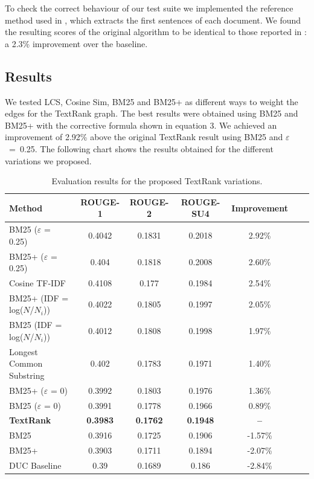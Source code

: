 \documentclass{llncs}
\begin{document}
To check the correct behaviour of our test suite we implemented the reference method used in \cite{mihalcea-tarau}, which extracts the first sentences of each document. We found the resulting scores of the original algorithm to be identical to those reported in \cite{mihalcea-tarau}: a 2.3\% improvement over the baseline.


\subsection{Results}
We tested LCS, Cosine Sim, BM25 and BM25+ as different ways to weight the edges for the TextRank graph. 
The best results were obtained using BM25 and BM25+ with the corrective formula shown in equation 3. We achieved an improvement of 2.92\% above the original TextRank result using BM25 and \mbox{$\varepsilon$ = 0.25}. The following chart shows the results obtained for the different variations we proposed.

\begin{table}
\caption{Evaluation results for the proposed TextRank variations.}
\begin{center}
\begin{tabular}{l*{5}{c}r}
\hline
\rule{0pt}{12pt}
Method & ROUGE-1 & ROUGE-2 & ROUGE-SU4 & Improvement \\[2pt]
\hline\rule{0pt}{12pt}\mbox{}\par\nobreak
BM25 ($\varepsilon$ = 0.25) & 0.4042 & 0.1831 & 0.2018 & 2.92\% \\
BM25+ ($\varepsilon$ = 0.25) & 0.404 & 0.1818 & 0.2008 & 2.60\% \\
Cosine TF-IDF & 0.4108 & 0.177 & 0.1984 & 2.54\% \\
BM25+ (IDF = log($N$/$N_i$)) & 0.4022 & 0.1805 & 0.1997 & 2.05\% \\ 
BM25 (IDF = log($N$/$N_i$)) & 0.4012 & 0.1808 & 0.1998 & 1.97\% \\ 
Longest Common Substring & 0.402 & 0.1783 & 0.1971 & 1.40\% \\
BM25+ ($\varepsilon$ = 0) & 0.3992 & 0.1803 & 0.1976 & 1.36\% \\ 
BM25 ($\varepsilon$ = 0) & 0.3991 & 0.1778 & 0.1966 & 0.89\% \\
\textbf{TextRank} & \textbf{0.3983} & \textbf{0.1762} & \textbf{0.1948} & \textbf{--}\\
BM25 & 0.3916 & 0.1725 & 0.1906 & -1.57\% \\
BM25+ & 0.3903 & 0.1711 & 0.1894 & -2.07\% \\
DUC Baseline & 0.39 & 0.1689 & 0.186 & -2.84\% \\ [2pt]
\hline
\end{tabular}
\end{center}
\end{table}
\end{document}
